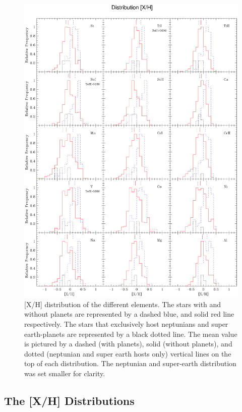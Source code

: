 \documentclass[oldversion]{aa}
\begin{document}
\begin{figure}[t!]
\centering
\includegraphics[trim=0cm 1.5cm 0cm 1cm,clip,width=17 cm]{pics/histxhpaperv3.eps}
\caption[depots]{[X/H] distribution of the different elements. The stars with and without planets are represented by a dashed blue, and solid red line respectively. The stars that exclusively host neptunians and super earth-planets are represented by a black dotted line. The mean value is pictured by a dashed (with planets), solid (without planets), and dotted (neptunian and super earth hosts only) vertical lines on the top of each distribution. The neptunian and super-earth distribution was set smaller for clarity.}
\label{fig:distro}
\end{figure}



\subsection{The [X/H] Distributions}
\end{document}

